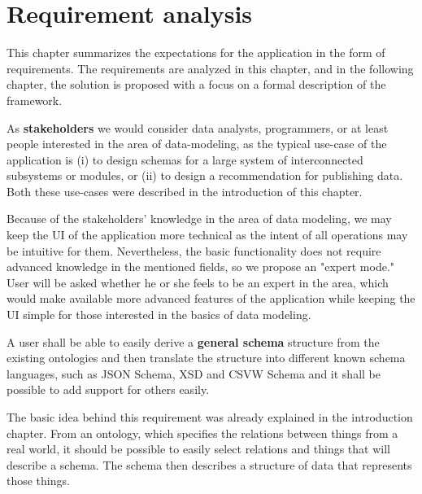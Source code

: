\chapter{Requirement analysis}\label{chapters:analysis}

This chapter summarizes the expectations for the application in the form of requirements. The requirements are analyzed in this chapter, and in the following chapter, the solution is proposed with a focus on a formal description of the framework.

\bigskip

As \textbf{stakeholders} we would consider data analysts, programmers, or at least people interested in the area of data-modeling, as the typical use-case of the application is (i) to design schemas for a large system of interconnected subsystems or modules, or (ii) to design a recommendation for publishing data. Both these use-cases were described in the introduction of this chapter.

Because of the stakeholders' knowledge in the area of data modeling, we may keep the UI of the application more technical as the intent of all operations may be intuitive for them. Nevertheless, the basic functionality does not require advanced knowledge in the mentioned fields, so we propose an "expert mode." User will be asked whether he or she feels to be an expert in the area, which would make available more advanced features of the application while keeping the UI simple for those interested in the basics of data modeling.

\bigskip

\begin{requirement}
A user shall be able to easily derive a \textbf{general schema} structure from the existing ontologies and then translate the structure into different known schema languages, such as JSON Schema, XSD and CSVW Schema and it shall be possible to add support for others easily.
\end{requirement}

The basic idea behind this requirement was already explained in the introduction chapter. From an ontology, which specifies the relations between things from a real world, it should be possible to easily select relations and things that will describe a schema. The schema then describes a structure of data that represents those things.

